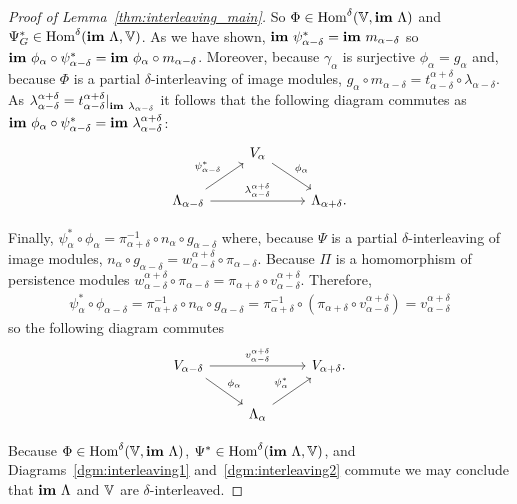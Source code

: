 \begin{proof}[Proof of Lemma~\ref{thm:interleaving_main}]
  So $\Phi\in\mathrm{Hom}^\delta(\mathbb{V},\mathbf{im}~\Lambda)$ and $\Psi_G^*\in\mathrm{Hom}^\delta(\mathbf{im}~\Lambda,\mathbb{V})$.
  As we have shown, $\mathbf{im}~\psi_{\alpha-\delta}^* = \mathbf{im}~m_{\alpha-\delta}$ so $\mathbf{im}~\phi_\alpha\circ\psi_{\alpha-\delta}^* = \mathbf{im}~\phi_\alpha\circ m_{\alpha-\delta}$.
  Moreover, because $\gamma_\alpha$ is surjective $\phi_\alpha = g_\alpha$ and, because $\Phi$ is a partial $\delta$-interleaving of image modules, $g_\alpha\circ m_{\alpha-\delta} = t_{\alpha-\delta}^{\alpha+\delta}\circ \lambda_{\alpha-\delta}$.
  As $\lambda_{\alpha-\delta}^{\alpha+\delta} = t_{\alpha-\delta}^{\alpha+\delta}\mathord{\mid}_{\mathbf{im}~\lambda_{\alpha-\delta}}$ it follows that the following diagram commutes as $\mathbf{im}~\phi_\alpha\circ\psi_{\alpha-\delta}^* = \mathbf{im}~\lambda_{\alpha-\delta}^{\alpha+\delta}$:
  \begin{equation}\label{dgm:interleaving1}
    \begin{tikzcd}
      & V_{\alpha}\arrow{dr}{\phi_\alpha} &\\
      \Lambda_{\alpha-\delta}\arrow{rr}{\lambda_{\alpha-\delta}^{\alpha+\delta}}\arrow{ur}{\psi_{\alpha-\delta}^*} & &
      \Lambda_{\alpha+\delta}.
  \end{tikzcd}\end{equation}

  Finally, $\psi_\alpha^*\circ\phi_\alpha = \pi_{\alpha+\delta}^{-1}\circ n_\alpha\circ g_{\alpha-\delta}$ where, because $\Psi$ is a partial $\delta$-interleaving of image modules, $n_\alpha\circ g_{\alpha-\delta} = w_{\alpha-\delta}^{\alpha+\delta}\circ\pi_{\alpha-\delta}$.
  Because $\Pi$ is a homomorphism of persistence modules $w_{\alpha-\delta}^{\alpha+\delta}\circ \pi_{\alpha-\delta} = \pi_{\alpha+\delta}\circ v_{\alpha-\delta}^{\alpha+\delta}$.
  Therefore,
  \begin{align*}
    \psi_\alpha^*\circ\phi_{\alpha-\delta} = \pi_{\alpha+\delta}^{-1}\circ n_\alpha\circ g_{\alpha-\delta} = \pi_{\alpha+\delta}^{-1}\circ (\pi_{\alpha+\delta}\circ v_{\alpha-\delta}^{\alpha+\delta}) = v_{\alpha-\delta}^{\alpha+\delta}
  \end{align*}
  so the following diagram commutes
  \begin{equation}\label{dgm:interleaving2}
    \begin{tikzcd}
      V_{\alpha-\delta}\arrow{rr}{v_{\alpha-\delta}^{\alpha+\delta}}\arrow{dr}{\phi_\alpha} & &
      V_{\alpha+\delta}.\\
      & \Lambda_{\alpha}\arrow{ur}{\psi_\alpha^*} &
  \end{tikzcd}\end{equation}

  Because $\Phi\in\mathrm{Hom}^\delta(\mathbb{V},\mathbf{im}~\Lambda)$, $\Psi^*\in\mathrm{Hom}^\delta(\mathbf{im}~\Lambda, \mathbb{V})$, and Diagrams~\ref{dgm:interleaving1} and~\ref{dgm:interleaving2} commute we may conclude that $\mathbf{im}~\Lambda$ and $\mathbb{V}$ are $\delta$-interleaved.

\end{proof}

